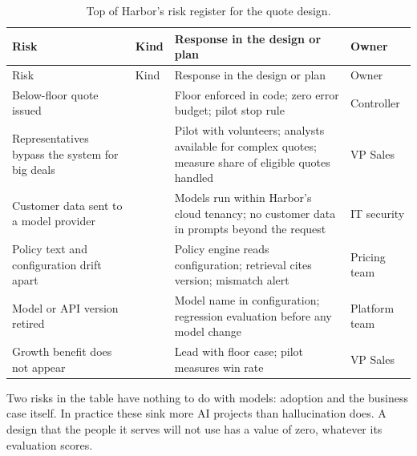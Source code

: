 \begingroup
\small
\begin{xltabular}{\textwidth}{@{}>{\raggedright\arraybackslash}p{3.1cm}>{\raggedright\arraybackslash}p{1.8cm}>{\raggedright\arraybackslash}X>{\raggedright\arraybackslash}p{1.9cm}@{}}
\caption{Top of Harbor's risk register for the quote design.}\label{tab:risk}\\
\toprule
{} Risk & Kind & Response in the design or plan & Owner \\
\midrule
\endfirsthead
\toprule
{} Risk & Kind & Response in the design or plan & Owner \\
\midrule
\endhead
Below-floor quote issued &  & Floor enforced in code; zero error budget; pilot stop rule & Controller \\
Representatives bypass the system for big deals &  & Pilot with volunteers; analysts available for complex quotes; measure share of eligible quotes handled & VP Sales \\
Customer data sent to a model provider &  & Models run within Harbor's cloud tenancy; no customer data in prompts beyond the request & IT security \\
Policy text and configuration drift apart &  & Policy engine reads configuration; retrieval cites version; mismatch alert & Pricing team \\
Model or API version retired &  & Model name in configuration; regression evaluation before any model change & Platform team \\
Growth benefit does not appear &  & Lead with floor case; pilot measures win rate & VP Sales \\
\bottomrule
\end{xltabular}
\endgroup

\begin{inpractice}
Two risks in the table have nothing to do with models: adoption and the business case itself. In practice these sink more AI projects than hallucination does. A design that the people it serves will not use has a value of zero, whatever its evaluation scores.
\end{inpractice}
